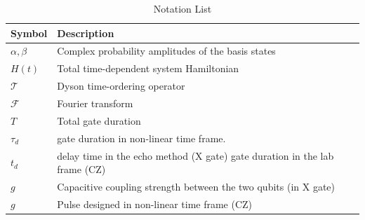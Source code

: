 \begin{table}[htbp]
  \centering
  \caption{Notation List}
  \label{tab:notation}
  \renewcommand{\arraystretch}{1.3}
  \begin{tabular}{l p{11cm}}
    \hline
    \textbf{Symbol}            & \textbf{Description}                                                              \\
    \hline
    $\alpha, \beta$            & Complex probability amplitudes of the basis states                                \\
    $H(t)$                     & Total time-dependent system Hamiltonian                                           \\
    $\mathcal{T}$              & Dyson time-ordering operator                                                      \\
    $\mathcal{F}$              & Fourier transform                                                                 \\
    $T$                        & Total gate duration                                                               \\
    $\tau_d$                   & gate duration in non-linear time frame.                                           \\
    $t_d$                      & delay time in the echo method (X gate) gate duration in the lab frame (CZ)        \\
    $g$                        & Capacitive coupling strength between the two qubits (in X gate)                   \\
    $g$                        & Pulse designed in non-linear time frame (CZ)                                      \\

\end{tabular}
\end{table}
